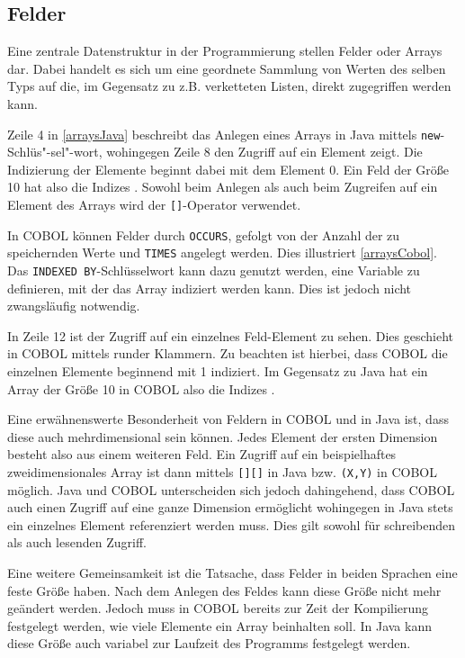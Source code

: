\subsection{Felder}\label{sec:felder}
Eine zentrale Datenstruktur in der Programmierung stellen Felder oder Arrays dar. Dabei handelt es sich um eine geordnete Sammlung von Werten des selben Typs auf die, im Gegensatz zu z.B. verketteten Listen, direkt zugegriffen werden kann.

Zeile 4 in \autoref{arraysJava} beschreibt das Anlegen eines Arrays in Java mittels \texttt{new}-Schlüs"-sel"-wort, wohingegen Zeile 8 den Zugriff auf ein Element zeigt. Die Indizierung der Elemente beginnt dabei mit dem Element 0. Ein Feld der Größe 10 hat also die Indizes . Sowohl beim Anlegen als auch beim Zugreifen auf ein Element des Arrays wird der \texttt{[]}-Operator verwendet.

In COBOL können Felder durch \texttt{OCCURS}, gefolgt von der Anzahl der zu speichernden Werte und \texttt{TIMES} angelegt werden. Dies illustriert \autoref{arraysCobol}. Das \texttt{INDEXED BY}-Schlüsselwort kann dazu genutzt werden, eine Variable zu definieren, mit der das Array indiziert werden kann. Dies ist jedoch nicht zwangsläufig notwendig.

In Zeile 12 ist der Zugriff auf ein einzelnes Feld-Element zu sehen. Dies geschieht in COBOL mittels runder Klammern. Zu beachten ist hierbei, dass COBOL die einzelnen Elemente beginnend mit 1 indiziert. Im Gegensatz zu Java hat ein Array der Größe 10 in COBOL also die Indizes .

Eine erwähnenswerte Besonderheit von Feldern in COBOL und in Java ist, dass diese auch mehrdimensional sein können. Jedes Element der ersten Dimension besteht also aus einem weiteren Feld. Ein Zugriff auf ein beispielhaftes zweidimensionales Array ist dann mittels \texttt{[][]} in Java bzw. \texttt{(X,Y)} in COBOL möglich. Java und COBOL unterscheiden sich jedoch dahingehend, dass COBOL auch einen Zugriff auf eine ganze Dimension ermöglicht wohingegen in Java stets ein einzelnes Element referenziert werden muss. Dies gilt sowohl für schreibenden als auch lesenden Zugriff.

Eine weitere Gemeinsamkeit ist die Tatsache, dass Felder in beiden Sprachen eine feste Größe haben. Nach dem Anlegen des Feldes kann diese Größe nicht mehr geändert werden. Jedoch muss in COBOL bereits zur Zeit der Kompilierung festgelegt werden, wie viele Elemente ein Array beinhalten soll. In Java kann diese Größe auch variabel zur Laufzeit des Programms festgelegt werden.
